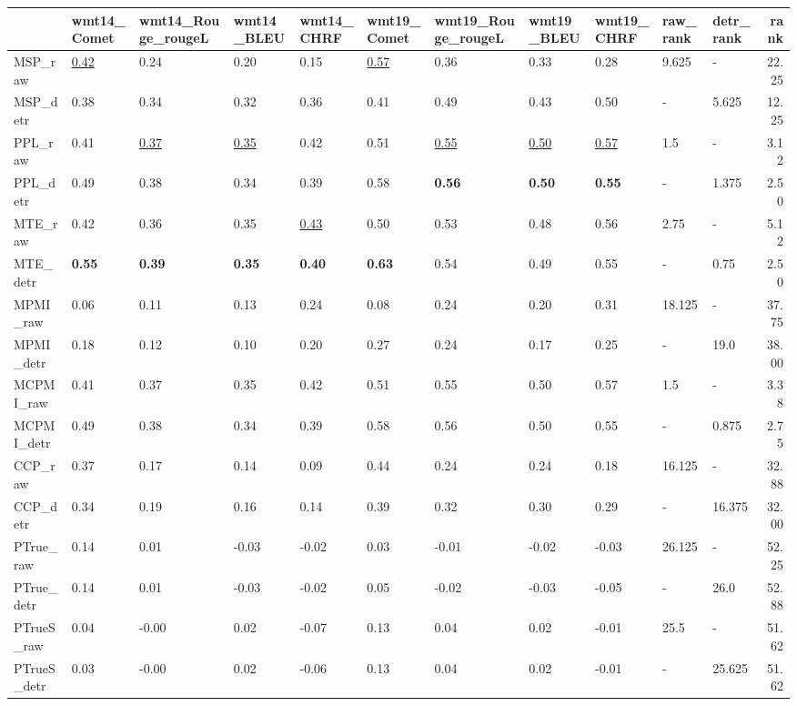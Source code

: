 \begin{tabular}{lllllllllllr}
\toprule
\midrule
 & wmt14\_Comet & wmt14\_Rouge\_rougeL & wmt14\_BLEU & wmt14\_CHRF & wmt19\_Comet & wmt19\_Rouge\_rougeL & wmt19\_BLEU & wmt19\_CHRF & raw\_rank & detr\_rank & rank \\
\midrule
\midrule
MSP\_raw & \underline{0.42} & 0.24 & 0.20 & 0.15 & \underline{0.57} & 0.36 & 0.33 & 0.28 & 9.625 & - & 22.25 \\
MSP\_detr & 0.38 & 0.34 & 0.32 & 0.36 & 0.41 & 0.49 & 0.43 & 0.50 & - & 5.625 & 12.25 \\
\midrule
PPL\_raw & 0.41 & \underline{0.37} & \underline{0.35} & 0.42 & 0.51 & \underline{0.55} & \underline{0.50} & \underline{0.57} & 1.5 & - & 3.12 \\
PPL\_detr & 0.49 & 0.38 & 0.34 & 0.39 & 0.58 & \textbf{0.56} & \textbf{0.50} & \textbf{0.55} & - & 1.375 & 2.50 \\
\midrule
MTE\_raw & 0.42 & 0.36 & 0.35 & \underline{0.43} & 0.50 & 0.53 & 0.48 & 0.56 & 2.75 & - & 5.12 \\
MTE\_detr & \textbf{0.55} & \textbf{0.39} & \textbf{0.35} & \textbf{0.40} & \textbf{0.63} & 0.54 & 0.49 & 0.55 & - & 0.75 & 2.50 \\
\midrule
MPMI\_raw & 0.06 & 0.11 & 0.13 & 0.24 & 0.08 & 0.24 & 0.20 & 0.31 & 18.125 & - & 37.75 \\
MPMI\_detr & 0.18 & 0.12 & 0.10 & 0.20 & 0.27 & 0.24 & 0.17 & 0.25 & - & 19.0 & 38.00 \\
\midrule
MCPMI\_raw & 0.41 & 0.37 & 0.35 & 0.42 & 0.51 & 0.55 & 0.50 & 0.57 & 1.5 & - & 3.38 \\
MCPMI\_detr & 0.49 & 0.38 & 0.34 & 0.39 & 0.58 & 0.56 & 0.50 & 0.55 & - & 0.875 & 2.75 \\
\midrule
CCP\_raw & 0.37 & 0.17 & 0.14 & 0.09 & 0.44 & 0.24 & 0.24 & 0.18 & 16.125 & - & 32.88 \\
CCP\_detr & 0.34 & 0.19 & 0.16 & 0.14 & 0.39 & 0.32 & 0.30 & 0.29 & - & 16.375 & 32.00 \\
\midrule
PTrue\_raw & 0.14 & 0.01 & -0.03 & -0.02 & 0.03 & -0.01 & -0.02 & -0.03 & 26.125 & - & 52.25 \\
PTrue\_detr & 0.14 & 0.01 & -0.03 & -0.02 & 0.05 & -0.02 & -0.03 & -0.05 & - & 26.0 & 52.88 \\
\midrule
PTrueS\_raw & 0.04 & -0.00 & 0.02 & -0.07 & 0.13 & 0.04 & 0.02 & -0.01 & 25.5 & - & 51.62 \\
PTrueS\_detr & 0.03 & -0.00 & 0.02 & -0.06 & 0.13 & 0.04 & 0.02 & -0.01 & - & 25.625 & 51.62 \\

\end{tabular}
